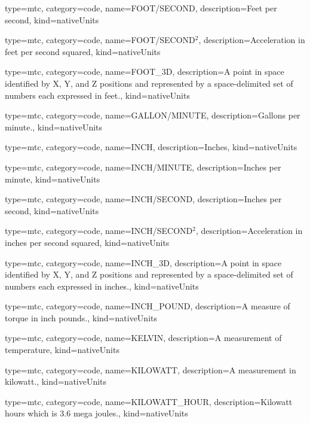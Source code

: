 {
  type=mtc,
  category=code,
  name={FOOT/SECOND},
  description={Feet per second},
  kind={nativeUnits}
}


{
  type=mtc,
  category=code,
  name={FOOT/SECOND$^2$},
  description={Acceleration in feet per second squared},
  kind={nativeUnits}
}


{
  type=mtc,
  category=code,
  name={FOOT\_3D},
  description={A point in space identified by X, Y, and Z positions and represented by a space-delimited set of numbers each expressed in feet.},
  kind={nativeUnits}
}


{
  type=mtc,
  category=code,
  name={GALLON/MINUTE},
  description={Gallons per minute.},
  kind={nativeUnits}
}


{
  type=mtc,
  category=code,
  name={INCH},
  description={Inches},
  kind={nativeUnits}
}


{
  type=mtc,
  category=code,
  name={INCH/MINUTE},
  description={Inches per minute},
  kind={nativeUnits}
}


{
  type=mtc,
  category=code,
  name={INCH/SECOND},
  description={Inches per second},
  kind={nativeUnits}
}


{
  type=mtc,
  category=code,
  name={INCH/SECOND$^2$},
  description={Acceleration in inches per second squared},
  kind={nativeUnits}
}


{
  type=mtc,
  category=code,
  name={INCH\_3D},
  description={A point in space identified by X, Y, and Z positions and represented by a space-delimited set of numbers each expressed in inches.},
  kind={nativeUnits}
}


{
  type=mtc,
  category=code,
  name={INCH\_POUND},
  description={A measure of torque in inch pounds.},
  kind={nativeUnits}
}


{
  type=mtc,
  category=code,
  name={KELVIN},
  description={A measurement of temperature},
  kind={nativeUnits}
}


{
  type=mtc,
  category=code,
  name={KILOWATT},
  description={A measurement in kilowatt.},
  kind={nativeUnits}
}


{
  type=mtc,
  category=code,
  name={KILOWATT\_HOUR},
  description={Kilowatt hours which is 3.6 mega joules.},
  kind={nativeUnits}
}


